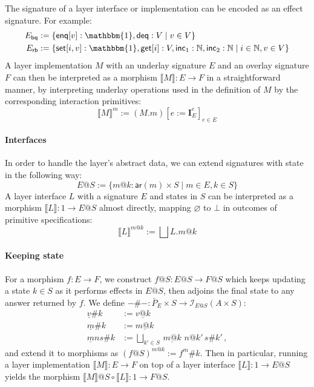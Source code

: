 \documentclass[sigplan,screen]{acmart}
\newcommand{\kw}[1]{\ensuremath{ \mathsf{#1} }}
\begin{document}
The signature of a layer interface or implementation
can be encoded as an effect signature.
For example:
\begin{align*}
  E_\kw{bq} &:= \{
    \kw{enq}[v] : \mathbbm{1}, \kw{deq} : V \mid
    v \in V \} \\
  E_\kw{rb} &:= \{
    \kw{set}[i, v] : \mathbbm{1},
    \kw{get}[i] : V,
    \kw{inc}_1 : \mathbb{N},
    \kw{inc}_2 : \mathbb{N} \mid
    i \in \mathbb{N}, v \in V \}
\end{align*}
A layer implementation $M$ with
an underlay signature $E$ and
an overlay signature $F$
can then be interpreted as a morphism
$\llbracket M \rrbracket : E \rightarrow F$
in a straightforward manner,
by interpreting underlay operations
used in the definition of $M$
by the corresponding interaction primitives:
\[
  \llbracket M \rrbracket^m := (M.m)[e := \mathbf{I}_E^e]_{e \in E}
\]

\paragraph{Interfaces}
In order to handle the layer's abstract data,
we can extend signatures with state in the following way:
\[
  E@S :=
    \{ m@k : \kw{ar}(m) \times S \mid
       m \in E, k \in S \}
\]
A layer interface $L$ with a signature $E$
and states in $S$
can be interpreted as
a morphism $\llbracket L \rrbracket : 1 \rightarrow E@S$
almost directly,
mapping $\varnothing$ to $\bot$
in outcomes of primitive specifications:
\[
  \llbracket L \rrbracket^{m@k} :=
    \bigsqcup L.m@k
\]

\paragraph{Keeping state}
For a morphism $f : E \rightarrow F$,
we construct $f@S : E@S \rightarrow F@S$
which keeps updating a state $k \in S$
as it performs effects in $E@S$,
then adjoins the final state to any answer
returned by $f$.
We define
$-\#- : \bar{P}_E \times S \rightarrow \mathcal{I}_{E@S}(A \times S)$:
\begin{align*}
  \underline{v}\#k &:= \underline{v@k} \\
  \underline{m}\#k &:= \underline{m@k} \\
  \underline{m}ns\#k &:=
    \bigsqcup_{k' \in S} \, \underline{m@k} \,\, n@k' \, s\#k' \,,
\end{align*}
and extend it to morphisms as $(f@S)^{m@k} := f^m\#k$.
Then in particular,
running a layer implementation
$\llbracket M \rrbracket : E \rightarrow F$
on top of a layer interface
$\llbracket L \rrbracket : 1 \rightarrow E@S$
yields the morphism
$\llbracket M \rrbracket @ S \circ \llbracket L \rrbracket :
 1 \rightarrow F@S$.
\end{document}

